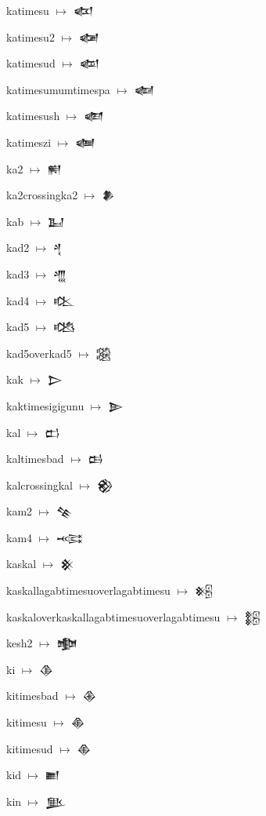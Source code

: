 {\noindent katimesu $\mapsto$ {\cufont 𒆇}\par
\noindent katimesu2 $\mapsto$ {\cufont 𒆈}\par
\noindent katimesud $\mapsto$ {\cufont 𒆉}\par
\noindent katimesumumtimespa $\mapsto$ {\cufont 𒆊}\par
\noindent katimesush $\mapsto$ {\cufont 𒆋}\par
\noindent katimeszi $\mapsto$ {\cufont 𒆌}\par
\noindent ka2 $\mapsto$ {\cufont 𒆍}\par
\noindent ka2crossingka2 $\mapsto$ {\cufont 𒆎}\par
\noindent kab $\mapsto$ {\cufont 𒆏}\par
\noindent kad2 $\mapsto$ {\cufont 𒆐}\par
\noindent kad3 $\mapsto$ {\cufont 𒆑}\par
\noindent kad4 $\mapsto$ {\cufont 𒆒}\par
\noindent kad5 $\mapsto$ {\cufont 𒆓}\par
\noindent kad5overkad5 $\mapsto$ {\cufont 𒆔}\par
\noindent kak $\mapsto$ {\cufont 𒆕}\par
\noindent kaktimesigigunu $\mapsto$ {\cufont 𒆖}\par
\noindent kal $\mapsto$ {\cufont 𒆗}\par
\noindent kaltimesbad $\mapsto$ {\cufont 𒆘}\par
\noindent kalcrossingkal $\mapsto$ {\cufont 𒆙}\par
\noindent kam2 $\mapsto$ {\cufont 𒆚}\par
\noindent kam4 $\mapsto$ {\cufont 𒆛}\par
\noindent kaskal $\mapsto$ {\cufont 𒆜}\par
\noindent kaskallagabtimesuoverlagabtimesu $\mapsto$ {\cufont 𒆝}\par
\noindent kaskaloverkaskallagabtimesuoverlagabtimesu $\mapsto$ {\cufont 𒆞}\par
\noindent kesh2 $\mapsto$ {\cufont 𒆟}\par
\noindent ki $\mapsto$ {\cufont 𒆠}\par
\noindent kitimesbad $\mapsto$ {\cufont 𒆡}\par
\noindent kitimesu $\mapsto$ {\cufont 𒆢}\par
\noindent kitimesud $\mapsto$ {\cufont 𒆣}\par
\noindent kid $\mapsto$ {\cufont 𒆤}\par
\noindent kin $\mapsto$ {\cufont 𒆥}\par
}
